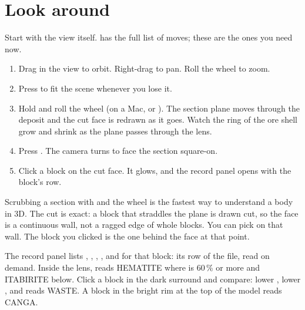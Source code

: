 \section{Look around}\label{sec:tour-look}
Start with the view itself.  has the full list of moves; these are the ones you need now.

\begin{tryit}
\begin{enumerate}
\item Drag in the view to orbit. Right-drag to pan. Roll the wheel to zoom.
\item Press  to fit the scene whenever you lose it.
\item Hold  and roll the wheel (on a Mac,  or ). The section plane moves through the deposit and the cut face is redrawn as it goes. Watch the ring of the ore shell grow and shrink as the plane passes through the lens.
\item Press . The camera turns to face the section square-on.
\item Click a block on the cut face. It glows, and the record panel opens with the block's row.
\end{enumerate}
\end{tryit}

Scrubbing a section with  and the wheel is the fastest way to understand a body in 3D. The cut is exact: a block that straddles the plane is drawn cut, so the face is a continuous wall, not a ragged edge of whole blocks. You can pick on that wall. The block you clicked is the one behind the face at that point.

The record panel lists , , , ,  and  for that block: its row of the file, read on demand. Inside the lens,  reads HEMATITE where  is 60\,\% or more and ITABIRITE below. Click a block in the dark surround and compare: lower , lower , and  reads WASTE. A block in the bright rim at the top of the model reads CANGA.


